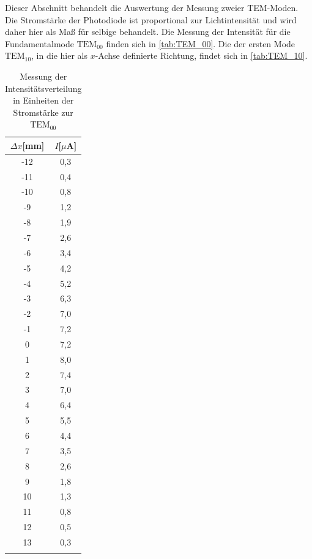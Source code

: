 Dieser Abschnitt behandelt die Auswertung der Messung zweier TEM-Moden.
Die Stromstärke der Photodiode ist proportional zur Lichtintensität und wird daher hier als Maß für selbige behandelt. Die Messung der Intensität für die Fundamentalmode $\text{TEM}_{00}$ finden sich in \autoref{tab:TEM_00}. Die der ersten Mode $\text{TEM}_{10}$, in die hier als $x$-Achse definierte Richtung, findet sich in \autoref{tab:TEM_10}.

\begin{table}
\centering
\caption{Messung der Intensitätsverteilung in Einheiten der Stromstärke zur $\text{TEM}_{00}$}
\begin{tabular}{c c}
\toprule
{$\Delta x$[mm]} & {$I$[$\mu$A]}\\
\midrule
-12	&	0,3	\\
-11	&	0,4	\\
-10	&	0,8	\\
-9	&	1,2	\\
-8	&	1,9	\\
-7	&	2,6	\\
-6	&	3,4	\\
-5	&	4,2	\\
-4	&	5,2	\\
-3	&	6,3	\\
-2	&	7,0	\\
-1	&	7,2	\\
0	&	7,2	\\
1	&	8,0	\\
2	&	7,4	\\
3	&	7,0	\\
4	&	6,4	\\
5	&	5,5	\\
6	&	4,4	\\
7	&	3,5	\\
8	&	2,6	\\
9	&	1,8	\\
10	&	1,3	\\
11	&	0,8	\\
12	&	0,5	\\
13	&	0,3	\\
\bottomrule
\label{tab:TEM_00}
\end{tabular}
\end{table}

